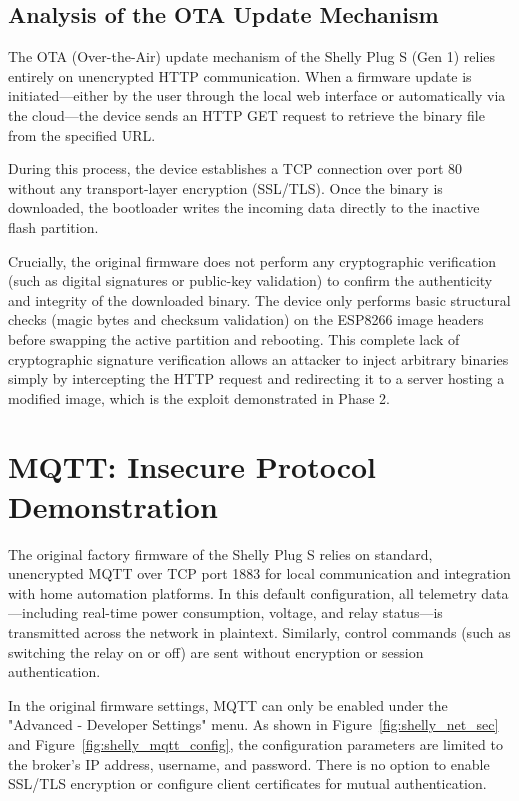 \subsection{Analysis of the OTA Update Mechanism}
The OTA (Over-the-Air) update mechanism of the Shelly Plug S (Gen 1) relies entirely on unencrypted HTTP communication. When a firmware update is initiated—either by the user through the local web interface or automatically via the cloud—the device sends an HTTP GET request to retrieve the binary file from the specified URL.

\noindent During this process, the device establishes a TCP connection over port 80 without any transport-layer encryption (SSL/TLS). Once the binary is downloaded, the bootloader writes the incoming data directly to the inactive flash partition. 

\noindent Crucially, the original firmware does not perform any cryptographic verification (such as digital signatures or public-key validation) to confirm the authenticity and integrity of the downloaded binary. The device only performs basic structural checks (magic bytes and checksum validation) on the ESP8266 image headers before swapping the active partition and rebooting. This complete lack of cryptographic signature verification allows an attacker to inject arbitrary binaries simply by intercepting the HTTP request and redirecting it to a server hosting a modified image, which is the exploit demonstrated in Phase 2.


\section{MQTT: Insecure Protocol Demonstration}
The original factory firmware of the Shelly Plug S relies on standard, unencrypted MQTT over TCP port 1883 for local communication and integration with home automation platforms. In this default configuration, all telemetry data—including real-time power consumption, voltage, and relay status—is transmitted across the network in plaintext. Similarly, control commands (such as switching the relay on or off) are sent without encryption or session authentication.

\noindent In the original firmware settings, MQTT can only be enabled under the "Advanced - Developer Settings" menu. As shown in Figure~\ref{fig:shelly_net_sec} and Figure~\ref{fig:shelly_mqtt_config}, the configuration parameters are limited to the broker's IP address, username, and password. There is no option to enable SSL/TLS encryption or configure client certificates for mutual authentication.


